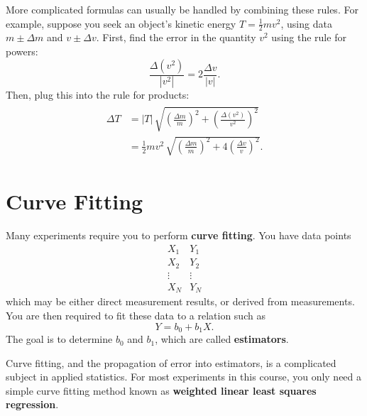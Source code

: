 \documentclass[11pt,a4paper]{article}
\begin{document}
More complicated formulas can usually be handled by combining these
rules.  For example, suppose you seek an object's kinetic energy $T =
\frac{1}{2}mv^2$, using data $m \pm \Delta m$ and $v \pm \Delta v$.
First, find the error in the quantity $v^2$ using the rule for powers:
\begin{equation*}
  \frac{\Delta (v^2)}{|v^2|} = 2 \frac{\Delta v}{|v|}.
\end{equation*}
Then, plug this into the rule for products:
\begin{align}
  \begin{aligned}
    \Delta T &= |T|\, \sqrt{\left(\frac{\Delta m}{m}\right)^2
      + \left(\frac{\Delta (v^2)}{v^2}\right)^2} \\
    &= \frac{1}{2} m v^2\, \sqrt{\left(\frac{\Delta m}{m}\right)^2
      + 4 \left(\frac{\Delta v}{v}\right)^2}.
  \end{aligned} \nonumber
\end{align}

\section{Curve Fitting}

Many experiments require you to perform \textbf{curve fitting}.  You
have data points
\begin{equation*}
  \begin{array}{c}X_1 \\ X_2 \\ \vdots \\ X_N \end{array}
  \begin{array}{c}Y_1 \\ Y_2 \\ \vdots \\ Y_N \end{array}
\end{equation*}
which may be either direct measurement results, or derived from
measurements.  You are then required to fit these data to a relation
such as
\begin{equation*}
  Y = b_0 + b_1 X.
\end{equation*}
The goal is to determine $b_0$ and $b_1$, which are called
\textbf{estimators}.

Curve fitting, and the propagation of error into estimators, is a
complicated subject in applied statistics.  For most experiments in
this course, you only need a simple curve fitting method known as
\textbf{weighted linear least squares regression}.
\end{document}

